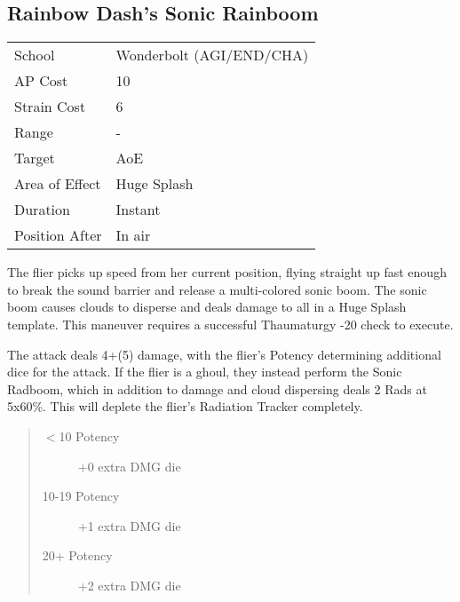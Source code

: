 \documentclass[11pt,a4paper,twocolumn]{book}
\begin{document}
\subsection*{Rainbow Dash's Sonic Rainboom}
{
	\begin{tabu} to 75mm{| X[l,4] | X[l,7] |}
		\hline
		School 			& Wonderbolt (AGI/END/CHA)		\\
		AP Cost	      	& 10 				\\
		Strain Cost     & 6 				\\
		Range     		& - 				\\
		Target      	& AoE 				\\
		Area of Effect  & Huge Splash 	 	\\
		Duration     	& Instant 	 		\\
		Position After  & In air 			\\ \hline
	\end{tabu}
	
}

\medskip

The flier picks up speed from her current position, flying straight up fast enough to break the sound barrier and release a multi-colored sonic boom. The sonic boom causes clouds to disperse and deals damage to all in a Huge Splash template. This maneuver requires a successful Thaumaturgy -20 check to execute.

The attack deals 4+(5) damage, with the flier's Potency determining additional dice for the attack. If the flier is a ghoul, they instead perform the Sonic Radboom, which in addition to damage and cloud dispersing deals 2 Rads at 5x60\%. This will deplete the flier's Radiation Tracker completely.

\begin{quote}
	\begin{description}
		\item[$<$10 Potency] 	+0 extra DMG die
		\item[10-19 Potency] 	+1 extra DMG die
		\item[20+ Potency] 	    +2 extra DMG die
	\end{description}
\end{quote}

\vfill
\end{document}

